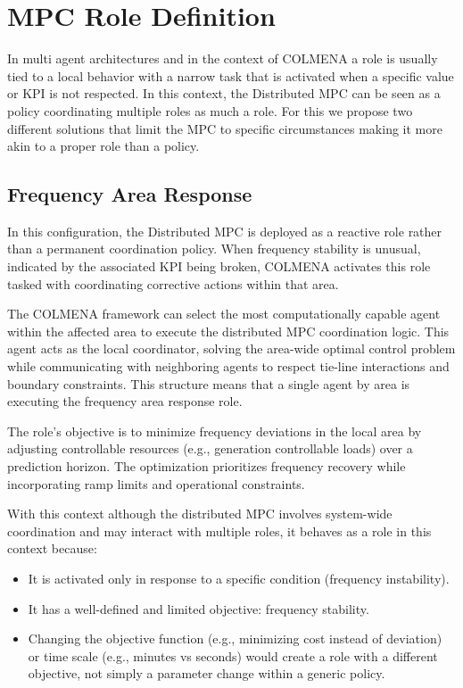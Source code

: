 \documentclass{article}
\begin{document}
\section{MPC Role Definition}

In multi agent architectures and in the context of COLMENA a role is usually tied to a local behavior with a narrow task that is activated when a specific value or KPI is not respected. In this context, the Distributed MPC can be seen as a policy coordinating multiple roles as much a role. For this we propose two different solutions that limit the MPC to specific circumstances making it more akin to a proper role than a policy.

\subsection{Frequency Area Response}

In this configuration, the Distributed MPC is deployed as a reactive role rather than a permanent coordination policy. When frequency stability is unusual, indicated by the associated KPI being broken, COLMENA activates this role tasked with coordinating corrective actions within that area.

The COLMENA framework can select the most computationally capable agent within the affected area to execute the distributed MPC coordination logic. This agent acts as the local coordinator, solving the area-wide optimal control problem while communicating with neighboring agents to respect tie-line interactions and boundary constraints. This structure means that a single agent by area is executing the frequency area response role.

The role's objective is to minimize frequency deviations in the local area by adjusting controllable resources (e.g., generation controllable loads) over a prediction horizon. The optimization prioritizes frequency recovery while incorporating ramp limits and operational constraints.
 
With this context although the distributed MPC involves system-wide coordination and may interact with multiple roles, it behaves as a role in this context because:
\begin{itemize}
    \item It is activated only in response to a specific condition (frequency instability).
    \item It has a well-defined and limited objective: frequency stability.
    \item Changing the objective function (e.g., minimizing cost instead of deviation) or time scale (e.g., minutes vs seconds) would create a role with a different objective, not simply a parameter change within a generic policy.
\end{itemize}
\end{document}
